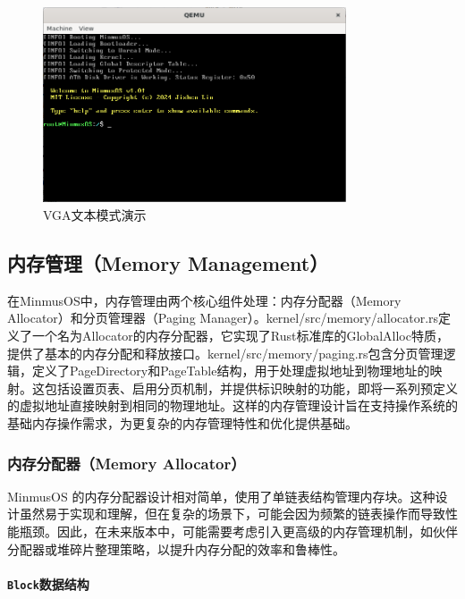 \begin{figure}[htbp]
    \centering
    \includegraphics[width=0.8\textwidth]{figures/VGATextModePresentation.png}
    \caption{VGA文本模式演示}
    \label{fig:VGATextModePresentation}
\end{figure}

\subsection{内存管理（Memory Management）}

在MinmusOS中，内存管理由两个核心组件处理：内存分配器（Memory Allocator）和分页管理器（Paging Manager）。kernel/src/memory/allocator.rs定义了一个名为Allocator的内存分配器，它实现了Rust标准库的GlobalAlloc特质，提供了基本的内存分配和释放接口。kernel/src/memory/paging.rs包含分页管理逻辑，定义了PageDirectory和PageTable结构，用于处理虚拟地址到物理地址的映射。这包括设置页表、启用分页机制，并提供标识映射的功能，即将一系列预定义的虚拟地址直接映射到相同的物理地址。这样的内存管理设计旨在支持操作系统的基础内存操作需求，为更复杂的内存管理特性和优化提供基础。

\subsubsection{内存分配器（Memory Allocator）}

MinmusOS 的内存分配器设计相对简单，使用了单链表结构管理内存块。这种设计虽然易于实现和理解，但在复杂的场景下，可能会因为频繁的链表操作而导致性能瓶颈。因此，在未来版本中，可能需要考虑引入更高级的内存管理机制，如伙伴分配器或堆碎片整理策略，以提升内存分配的效率和鲁棒性。

\paragraph{\texttt{Block}数据结构}

